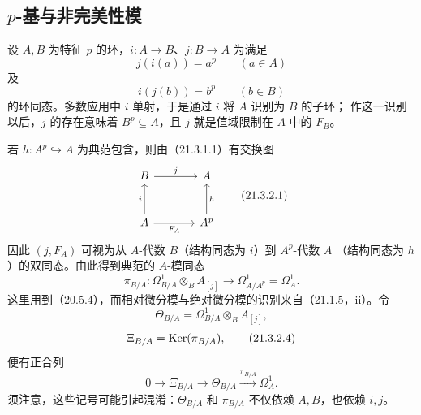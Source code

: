 \subsection{\texorpdfstring{$p$-基与非完美性模}{p-基与非完美性模}}
设 $A,B$ 为特征 $p$ 的环，$i:A\to B$、$j:B\to A$ 为满足
\begin{equation}
 j(i(a))=a^p\qquad(a\in A)
 \tag{21.3.1.1}
\end{equation}
及
\begin{equation}
 i(j(b))=b^p\qquad(b\in B)
 \tag{21.3.1.2}
\end{equation}
的环同态。多数应用中 $i$ 单射，于是通过 $i$ 将 $A$ 识别为 $B$ 的子环；
作这一识别以后，$j$ 的存在意味着 $B^p\subseteq A$，且 $j$ 就是值域限制在 $A$ 中的 $F_B$。

若 $h:A^p\hookrightarrow A$ 为典范包含，则由（21.3.1.1）有交换图
\begin{equation}
 \begin{tikzcd}[column sep=large,row sep=large]
 B\arrow[r,"j"] & A\\
 A\arrow[u,"i"]\arrow[r,"F_A"'] & A^p\arrow[u,"h"']
 \end{tikzcd}
 \tag{21.3.2.1}
\end{equation}
因此 $(j,F_A)$ 可视为从 $A$-代数 $B$（结构同态为 $i$）到 $A^p$-代数 $A$
（结构同态为 $h$）的双同态。由此得到典范的 $A$-模同态
\begin{equation}
 \pi_{B/A}:\Omega^1_{B/A}\otimes_B A_{[j]}
 \longrightarrow\Omega^1_{A/A^p}=\Omega^1_A.
 \tag{21.3.2.2}
\end{equation}
这里用到（20.5.4），而相对微分模与绝对微分模的识别来自（21.1.5，ii）。令
\begin{equation}
 \Theta_{B/A}=\Omega^1_{B/A}\otimes_B A_{[j]},
 \tag{21.3.2.3}
\end{equation}
\begin{equation}
 \Xi_{B/A}=\operatorname{Ker}(\pi_{B/A}),
 \tag{21.3.2.4}
\end{equation}
便有正合列
\begin{equation}
 0\longrightarrow\Xi_{B/A}\longrightarrow\Theta_{B/A}
 \xrightarrow{\pi_{B/A}}\Omega^1_A.
 \tag{21.3.2.5}
\end{equation}
须注意，这些记号可能引起混淆：$\Theta_{B/A}$ 和 $\pi_{B/A}$ 不仅依赖 $A,B$，也依赖 $i,j$。

